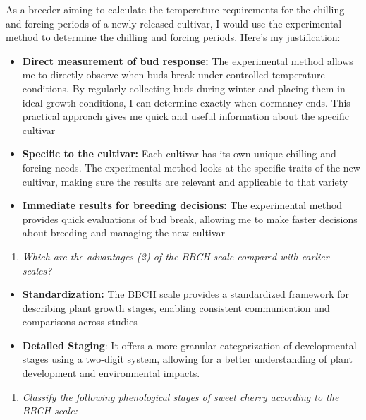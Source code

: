 \documentclass[
]{article}
\providecommand{\tightlist}{%
  \setlength{\itemsep}{0pt}\setlength{\parskip}{0pt}}
\begin{document}
As a breeder aiming to calculate the temperature requirements for the chilling and forcing periods of a newly released cultivar, I would use the experimental method to determine the chilling and forcing periods. Here's my justification:

\begin{itemize}
\item
  \textbf{Direct measurement of bud response:} The experimental method allows me to directly observe when buds break under controlled temperature conditions. By regularly collecting buds during winter and placing them in ideal growth conditions, I can determine exactly when dormancy ends. This practical approach gives me quick and useful information about the specific cultivar
\item
  \textbf{Specific to the cultivar:} Each cultivar has its own unique chilling and forcing needs. The experimental method looks at the specific traits of the new cultivar, making sure the results are relevant and applicable to that variety
\item
  \textbf{Immediate results for breeding decisions:} The experimental method provides quick evaluations of bud break, allowing me to make faster decisions about breeding and managing the new cultivar
\end{itemize}

\begin{enumerate}
\def\labelenumi{\arabic{enumi}.}
\setcounter{enumi}{1}
\tightlist
\item
  \emph{Which are the advantages (2) of the BBCH scale compared with earlier scales?}
\end{enumerate}

\begin{itemize}
\tightlist
\item
  \textbf{Standardization:} The BBCH scale provides a standardized framework for describing plant growth stages, enabling consistent communication and comparisons across studies
\item
  \textbf{Detailed Staging}: It offers a more granular categorization of developmental stages using a two-digit system, allowing for a better understanding of plant development and environmental impacts.
\end{itemize}

\begin{enumerate}
\def\labelenumi{\arabic{enumi}.}
\setcounter{enumi}{2}
\tightlist
\item
  \emph{Classify the following phenological stages of sweet cherry according to the BBCH scale:}
\end{enumerate}
\end{document}
